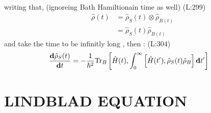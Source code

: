  writing that, (ignoreing Bath Hamiltionain time as well)
(L:299)
\begin{equation}
\begin{split}
\hat{\rho }(t )&=\hat{\rho }_{S }(t )\otimes \hat{\rho }_{B (t )}\\
&=\hat{\rho }_{S }(t )\hat{\rho }_{B (t )}\end{split}
\end{equation}
 and take the time to be infinitly long , then  : 
(L:304)
\begin{equation}
\begin{split}
\label{eqDensity}\dfrac{\bold{d}\hat{\rho }_{S }(t )}{\bold{d}t }&=-\dfrac{1}{\hbar ^{2}}\text{Tr}_{B }\left[\hat{H }(t ),\int _{0}^{\infty }\left[\hat{H }(t '),\hat{\rho }_{S }(t )\hat{\rho }_{B }\right]\bold{d}t '\right]\end{split}
\end{equation}
 \section {LINDBLAD EQUATION}
